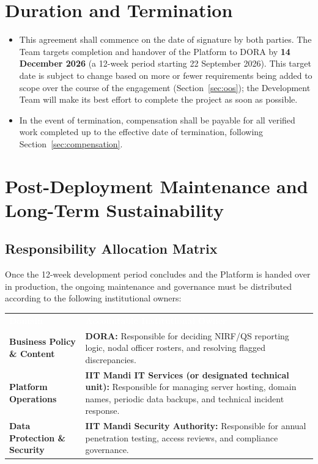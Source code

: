 \documentclass[11pt]{article}
\renewcommand{\arraystretch}{1.15}
\begin{document}
\section{Duration and Termination}
\label{sec:duration}
\begin{itemize}[leftmargin=1.4em, itemsep=3pt]
\item This agreement shall commence on the date of signature by both parties. The Team targets completion and handover of the Platform to DORA by \textbf{14 December 2026} (a 12-week period starting 22 September 2026). This target date is subject to change based on more or fewer requirements being added to scope over the course of the engagement (Section~\ref{sec:oos}); the Development Team will make its best effort to complete the project as soon as possible.
\item In the event of termination, compensation shall be payable for all verified work completed up to the effective date of termination, following Section~\ref{sec:compensation}.
\end{itemize}

\section{Post-Deployment Maintenance and Long-Term Sustainability}
\label{sec:sustainability}

\subsection{Responsibility Allocation Matrix}
Once the 12-week development period concludes and the Platform is handed over in production, the ongoing maintenance and governance must be distributed according to the following institutional owners:

\begin{table}[h]
\centering
\renewcommand{\arraystretch}{1.4}
\begin{tabular}{p{4.5cm} p{10cm}}
\rowcolor{primary}
\textcolor{white}{\textbf{Domain}} & \textcolor{white}{\textbf{Accountable Institutional Owner}} \\
\rowcolor{lightbg}
\textbf{Business Policy \& Content} & \textbf{DORA:} Responsible for deciding NIRF/QS reporting logic, nodal officer rosters, and resolving flagged discrepancies. \\
\rowcolor{white}
\textbf{Platform Operations} & \textbf{IIT Mandi IT Services (or designated technical unit):} Responsible for managing server hosting, domain names, periodic data backups, and technical incident response. \\
\rowcolor{lightbg}
\textbf{Data Protection \& Security} & \textbf{IIT Mandi Security Authority:} Responsible for annual penetration testing, access reviews, and compliance governance. \\
\end{tabular}
\end{table}
\end{document}
